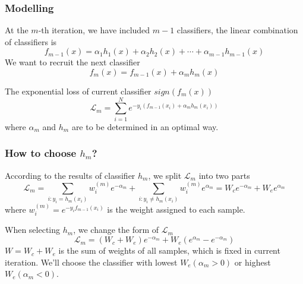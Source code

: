 \documentclass{beamer}
\begin{document}
\begin{CJK*}{UTF8}{gbsn}
\begin{frame}\frametitle{Modelling}
At the $m$-th iteration, we have included $m-1$ classifiers, the linear combination of classifiers is
\begin{equation}
f_{m-1}(x)=\alpha_1h_1(x)+\alpha_2h_2(x)+\cdots+\alpha_{m-1}h_{m-1}(x)
\end{equation}
We want to recruit the next classifier
\begin{equation}
f_m(x)=f_{m-1}(x)+\alpha_mh_m(x)
\end{equation}
\begin{exampleblock}{The exponential loss of current classifier $sign(f_m(x))$}
\begin{equation}
\mathcal{L}_m=\sum_{i=1}^Ne^{-y_i(f_{m-1}(x_i)+\alpha_mh_m(x_i))}
\end{equation}
where $\alpha_m$ and $h_m$ are to be determined in an optimal way.
\end{exampleblock}
\end{frame}

\begin{frame}\frametitle{How to choose $h_m$?}
\begin{block}{}
According to the results of classifier $h_m$, we split $\mathcal{L}_m$ into two parts
\begin{equation}
\mathcal{L}_m=\sum_{i:y_i=h_m(x_i)}w_i^{(m)}e^{-\alpha_m}+\sum_{i:y_i\neq h_m(x_i)}w_i^{(m)}e^{\alpha_m}=W_ce^{-\alpha_m}+W_ee^{\alpha_m}
\end{equation}
where $w_i^{(m)}=e^{-y_if_{m-1}(x_i)}$ is the weight assigned to each sample.
\end{block}
\begin{alertblock}{}
When selecting $h_m$, we change the form of \(\mathcal{L}_m\)
\begin{equation}
\mathcal{L}_m=(W_c+W_e)e^{-\alpha_m}+W_e(e^{\alpha_m}-e^{-\alpha_m})
\end{equation}
$W=W_c+W_e$ is the sum of weights of all samples, which is fixed in current iteration. We'll choose the classifier with lowest $W_e(\alpha_m>0)$ or highest $W_e(\alpha_m<0)$.
\end{alertblock}
\end{frame}



\end{CJK*}
\end{document}
